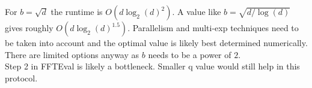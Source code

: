 \documentclass[12pt]{article}
\begin{document}
	For $b=\sqrt{d}$ the runtime is $O(d \log_2(d)^2)$. A value like $b=\sqrt{d/\log(d)}$ gives roughly $O(d\log_2(d)^{1.5})$. Parallelism and multi-exp techniques need to be taken into account and the optimal value is likely best determined numerically. There are limited options anyway as $b$ needs to be a power of $2$.\\ 
Step 2 in FFTEval is likely a bottleneck. Smaller q value would still help in this protocol.
\begin{comment}
\section{Other ideas (WIP)}
\subsection{No field elements eval}


\begin{mdframed}
Public Input: $C\in \GG,z\in \ZZ_p,y\in \ZZ_p$\\
Witness: $f(X) \in \ZZ_p[X]$ \\
Claim: $C=\commit(f(X))$, $\deg(f(X))<d$ and $f(z)=y \bmod p$
	\begin{enumerate}[nolistsep]
		\item $\prover$ computes $q(X) \in \ZZ_p[X]=f(X)//(X-z) \bmod p$ and $Q\gets\commit(q(X))$
		\item \prover sends $Q$ to $\verifier$.
		\item $\prover$ and $\verifier$ compute $D\gets C/(Q^{(q-z)}g^y)$ \pccomment{$D$ commits to $h(X)=f(X)-q(X)(X-z)-y\equiv 0\bmod p$.}

		\item \prover and \verifier run $\textsf{DegreeProof}(D,Q^q,d;h(X),q(X)\cdot X)$
	\end{enumerate}
\end{mdframed}


\end{comment}
\end{document}
